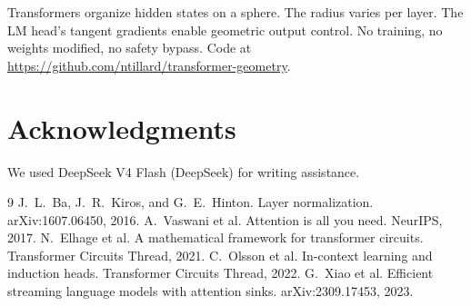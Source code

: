 \documentclass{article}
\begin{document}
Transformers organize hidden states on a sphere. The radius varies per layer. The LM head's tangent gradients enable geometric output control. No training, no weights modified, no safety bypass. Code at \url{https://github.com/ntillard/transformer-geometry}.

\section*{Acknowledgments}

We used DeepSeek V4 Flash (DeepSeek) for writing assistance.

\begin{thebibliography}{9}
 J.~L.~Ba, J.~R.~Kiros, and G.~E.~Hinton. \newblock Layer normalization. \newblock arXiv:1607.06450, 2016.
 A.~Vaswani et al. \newblock Attention is all you need. \newblock NeurIPS, 2017.
 N.~Elhage et al. \newblock A mathematical framework for transformer circuits. \newblock Transformer Circuits Thread, 2021.
 C.~Olsson et al. \newblock In-context learning and induction heads. \newblock Transformer Circuits Thread, 2022.
 G.~Xiao et al. \newblock Efficient streaming language models with attention sinks. \newblock arXiv:2309.17453, 2023.
\end{thebibliography}
\end{document}
